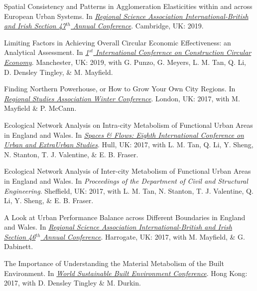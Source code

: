 \documentclass[10pt]{article}
\begin{document}
\begin{etaremune}[leftmargin=0ex, topsep=0ex]
	\item Spatial Consistency and Patterns in Agglomeration Elasticities within and across European Urban Systems. In \emph{\href{http://www.rsai-bis.org/previous-conferences.html}{Regional Science Association International-British and Irish Section 47$^{th}$ Annual Conference}}. Cambridge, UK: 2019.
	
	\item Limiting Factors in Achieving Overall Circular Economic Effectiveness: an Analytical Assessment. In \emph{\href{http://www.confercare.manchester.ac.uk/events/iccce2019/programme/}{1$^{st}$ International Conference on Construction Circular Economy}}. Manchester, UK: 2019, with G. Punzo, G. Meyers, L. M. Tan, Q. Li, D. Densley Tingley, \& M. Mayfield.
	
	\item Finding Northern Powerhouse, or How to Grow Your Own City Regions. In \emph{\href{https://www.regionalstudies.org/events/rsa-winter-2017/}{Regional Studies Association Winter Conference}}. London, UK: 2017, with M. Mayfield \& P. McCann.
	
	\item Ecological Network Analysis on Intra-city Metabolism of Functional Urban Areas in England and Wales. In \emph{\href{https://spacesandflows.com/about/history/2017-conference}{Spaces \& Flows: Eighth International Conference on Urban and ExtraUrban Studies}}. Hull, UK: 2017, with L. M. Tan, Q. Li, Y. Sheng, N. Stanton, T. J. Valentine, \& E. B. Fraser.\label{c2rise.net}
	
	\item Ecological Network Analysis of Inter-city Metabolism of Functional Urban Areas in England and Wales. In \emph{Proceedings of the Department of Civil and Structural Engineering}. Sheffield, UK: 2017, with L. M. Tan, N. Stanton, T. J. Valentine, Q. Li, Y. Sheng, \& E. B. Fraser.\label{c1rise.net}
	
	\item A Look at Urban Performance Balance across Different Boundaries in England and Wales. In \emph{\href{http://www.rsai-bis.org/previous-conferences.html}{Regional Science Association International-British and Irish Section 46$^{th}$ Annual Conference}}. Harrogate, UK: 2017, with M. Mayfield, \& G. Dabinett.\label{rsai-bi}
	
	\item The Importance of Understanding the Material Metabolism of the Built Environment. In \emph{\href{https://www.wsbe17hongkong.hk/presentation-files}{World Sustainable Built Environment Conference}}. Hong Kong: 2017, with D. Densley Tingley \& M. Durkin.
	

\end{etaremune}
\end{document}
